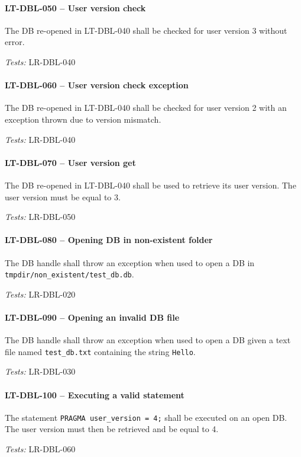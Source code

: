 \paragraph{LT-DBL-050 -- User version check}
The DB re-opened in LT-DBL-040 shall be checked for user version 3
without error.

\textit{Tests: } LR-DBL-040

\paragraph{LT-DBL-060 -- User version check exception}
The DB re-opened in LT-DBL-040 shall be checked for user version 2
with an exception thrown due to version mismatch.

\textit{Tests: } LR-DBL-040

\paragraph{LT-DBL-070 -- User version get}
The DB re-opened in LT-DBL-040 shall be used to retrieve its user
version. The user version must be equal to 3.

\textit{Tests: } LR-DBL-050

\paragraph{LT-DBL-080 -- Opening DB in non-existent folder}
The DB handle shall throw an exception when used to open
a DB in \lstinline{tmpdir/non_existent/test_db.db}.

\textit{Tests: } LR-DBL-020

\paragraph{LT-DBL-090 -- Opening an invalid DB file}
The DB handle shall throw an exception when used to open a DB
given a text file named \lstinline{test_db.txt} containing
the string \lstinline{Hello}.

\textit{Tests: } LR-DBL-030

\paragraph{LT-DBL-100 -- Executing a valid statement}
The statement \lstinline{PRAGMA user_version = 4;} shall be executed
on an open DB. The user version must then be retrieved and be equal
to 4.

\textit{Tests: } LR-DBL-060

